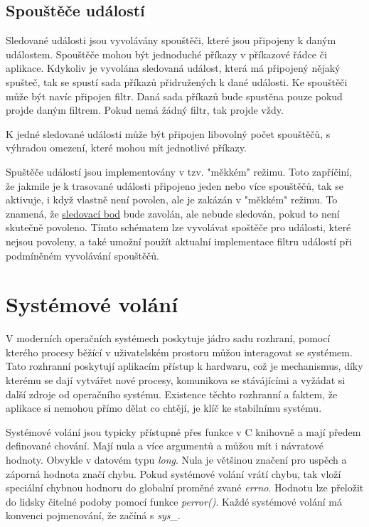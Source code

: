 \subsection*{Spouštěče událostí}

Sledované události jsou vyvolávány spouštěči, které jsou připojeny k daným událostem. Spouštěče mohou být jednoduché příkazy v příkazové řádce či aplikace. Kdykoliv je vyvolána sledovaná událost, která má připojený nějaký spušteč, tak se spustí sada příkazů přidružených k dané události. Ke spouštěči může být navíc připojen filtr. Daná sada příkazů bude spustěna pouze pokud projde daným filtrem. Pokud nemá žádný filtr, tak projde vždy.

K jedné sledované události může být připojen libovolný počet spouštěčů, s výhradou omezení, které mohou mít jednotlivé příkazy.

Spuštěče událostí jsou implementovány v tzv. "měkkém" režimu. Toto zapříčiní, že jakmile je k trasované události připojeno jeden nebo více spouštěčů, tak se aktivuje, i když vlastně není povolen, ale je zakázán v "měkkém" režimu. To znamená, že \hyperref[sec:SledovaciBod]{sledovací bod} bude zavolán, ale nebude sledován, pokud to není skutečně povoleno. Tímto schématem lze vyvolávat spoštěče pro události, které nejsou povoleny, a také umožní použít aktualní implementace filtru událostí při podmíněném vyvolávání spouštěčů.

\section{Systémové volání}
\label{sec:systemoveVolani}

V moderních operačních systémech poskytuje jádro sadu rozhraní, pomocí kterého procesy běžící v uživatelském prostoru můžou interagovat
se systémem. Tato rozhranní poskytují aplikacím přístup k hardwaru, což je mechanismus, díky kterému se dají vytvářet nové procesy,
komunikova se stávájícími a vyžádat si další zdroje od operačního systému. Existence těchto rozhranní a faktem, že aplikace si nemohou přímo
dělat co chtějí, je klíč ke stabilnímu systému.

Systémové volání\cite{LinuxKernelDevelopment} jsou typicky přístupné přes funkce v C knihovně a mají předem definované chování. Mají nula
a více argumentů a můžou mít i návratové hodnoty. Obvykle v datovém typu \emph{long}. Nula je většinou značení pro uspěch a záporná hodnota značí chybu.
Pokud systémové volání vrátí chybu, tak vloží speciální chybnou hodnoru do globalní proměné zvané \emph{errno}. Hodnotu lze přeložit do
lidsky čitelné podoby pomocí funkce \emph{perror()}. Každé systémové volání má konvenci pojmenování, že začíná s \emph{sys\_}.

